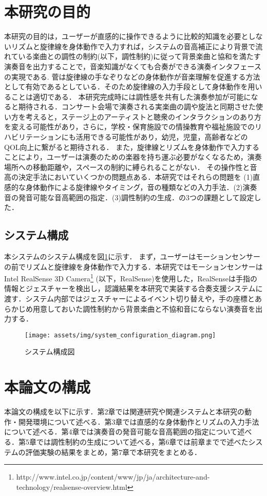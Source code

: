 \section{本研究の目的}
本研究の目的は，ユーザーが直感的に操作できるように比較的知識を必要としないリズムと旋律線を身体動作で入力すれば，システムの音高補正により背景で流れている楽曲との調性の制約(以下，調性制約)に従って背景楽曲と協和を満たす演奏音を出力することで，音楽知識がなくても合奏ができる演奏インタフェースの実現である. 菅\cite{suga2008}は旋律線の手なぞりなどの身体動作が音楽理解を促進する方法として有効であるとしている．そのため旋律線の入力手段として身体動作を用いることは適切である．
本研究完成時には調性感を共有した演奏参加が可能になると期待される．コンサート会場で演奏される実楽曲の調や旋法と同期させた使い方を考えると，ステージ上のアーティストと聴衆のインタラクションのあり方を変える可能性があり，さらに，学校・保育施設での情操教育や福祉施設でのリハビリテーションにも活用できる可能性があり，幼児，児童，高齢者などのQOL向上に繋がると期待される．
また，旋律線とリズムを身体動作で入力することにより，ユーザーは演奏のための楽器を持ち運ぶ必要がなくなるため，演奏場所への移動距離や，スペースの制約に縛られることがない．
その操作性と音高の決定手法においていくつかの問題点ある．本研究ではそれらの問題を
(1)直感的な身体動作による旋律線やタイミング，音の種類などの入力手法．(2)演奏音の発音可能な音高範囲の指定．(3)調性制約の生成．の3つの課題として設定した．
\subsection{システム構成}
本システムのシステム構成を図\ref{img:sys_const}に示す．
まず，ユーザーはモーションセンサーの前でリズムと旋律線を身体動作で入力する．本研究ではモーションセンサーはIntel RealSense 3D Camera\footnote{http://www.intel.co.jp/content/www/jp/ja/architecture-and-technology/realsense-overview.html} (以下，RealSense)を使用した，RealSenseは手指の情報とジェスチャーを検出し，認識結果を本研究で実装する合奏支援システムに渡す．システム内部ではジェスチャーによるイベント切り替えや，手の座標とあらかじめ用意しておいた調性制約から背景楽曲と不協和音にならない演奏音を出力する．
\begin{figure}[t]
	\begin{center}
		\texttt{[image: assets/img/system\_configuration\_diagram.png]}
		\caption{システム構成図}
		\label{img:sys_const}
	\end{center}
\end{figure}
\section{本論文の構成}
本論文の構成を以下に示す．第2章では関連研究や関連システムと本研究の動作・開発環境について述べる．第3章では直感的な身体動作とリズムの入力手法について述べる．第4章では演奏音の発音可能な音高範囲の指定について述べる．第5章では調性制約の生成について述べる，第6章では前章までで述べたシステムの評価実験の結果をまとめ，第7章で本研究をまとめる．

